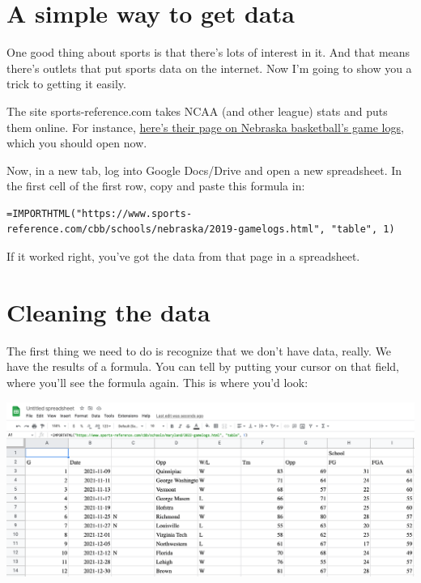 \documentclass[
]{book}
\begin{document}
\hypertarget{a-simple-way-to-get-data}{%
\section{A simple way to get data}\label{a-simple-way-to-get-data}}

One good thing about sports is that there's lots of interest in it. And that means there's outlets that put sports data on the internet. Now I'm going to show you a trick to getting it easily.

The site sports-reference.com takes NCAA (and other league) stats and puts them online. For instance, \href{https://www.sports-reference.com/cbb/schools/nebraska/2019-gamelogs.html}{here's their page on Nebraska basketball's game logs}, which you should open now.

Now, in a new tab, log into Google Docs/Drive and open a new spreadsheet. In the first cell of the first row, copy and paste this formula in:

\begin{verbatim}
=IMPORTHTML("https://www.sports-reference.com/cbb/schools/nebraska/2019-gamelogs.html", "table", 1)
\end{verbatim}

If it worked right, you've got the data from that page in a spreadsheet.

\hypertarget{cleaning-the-data}{%
\section{Cleaning the data}\label{cleaning-the-data}}

The first thing we need to do is recognize that we don't have data, really. We have the results of a formula. You can tell by putting your cursor on that field, where you'll see the formula again. This is where you'd look:

\includegraphics[width=33.28in]{images/clean1}
\end{document}
